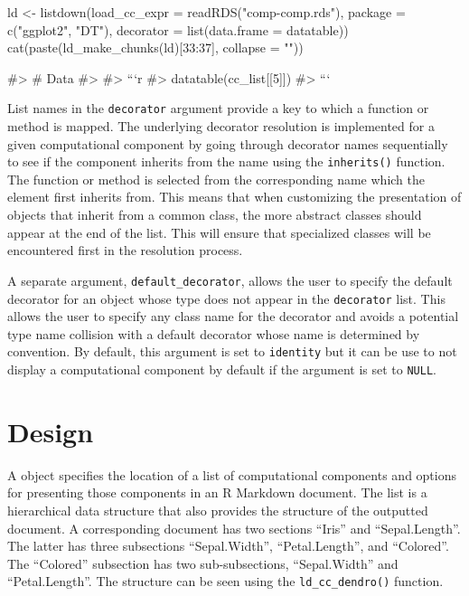 \begin{Schunk}
\begin{Sinput}
ld <- listdown(load_cc_expr = readRDS("comp-comp.rds"), 
               package = c("ggplot2", "DT"),
               decorator = list(data.frame = datatable))
cat(paste(ld_make_chunks(ld)[33:37], collapse = "\n"))
\end{Sinput}
\begin{Soutput}
#> # Data
#> 
#> ```{r}
#> datatable(cc_list[[5]])
#> ```
\end{Soutput}
\end{Schunk}

List names in the \texttt{decorator} argument provide a key to which a
function or method is mapped. The underlying decorator resolution is
implemented for a given computational component by going through
decorator names sequentially to see if the component inherits from the
name using the \texttt{inherits()} function. The function or method is
selected from the corresponding name which the element first inherits
from. This means that when customizing the presentation of objects that
inherit from a common class, the more abstract classes should appear at
the end of the list. This will ensure that specialized classes will be
encountered first in the resolution process.

A separate argument, \texttt{default\_decorator}, allows the user to
specify the default decorator for an object whose type does not appear
in the \texttt{decorator} list. This allows the user to specify any
class name for the decorator and avoids a potential type name collision
with a default decorator whose name is determined by convention. By
default, this argument is set to \texttt{identity} but it can be use to
not display a computational component by default if the argument is set
to \texttt{NULL}.

\hypertarget{design}{%
\section{Design}\label{design}}

A  object specifies the location of a list of
computational components and options for presenting those components in
an R Markdown document. The list is a hierarchical data structure that
also provides the structure of the outputted document. A corresponding
document has two sections ``Iris'' and ``Sepal.Length''. The latter has
three subsections ``Sepal.Width'', ``Petal.Length'', and ``Colored''.
The ``Colored'' subsection has two sub-subsections, ``Sepal.Width'' and
``Petal.Length''. The structure can be seen using the
\texttt{ld\_cc\_dendro()} function.

